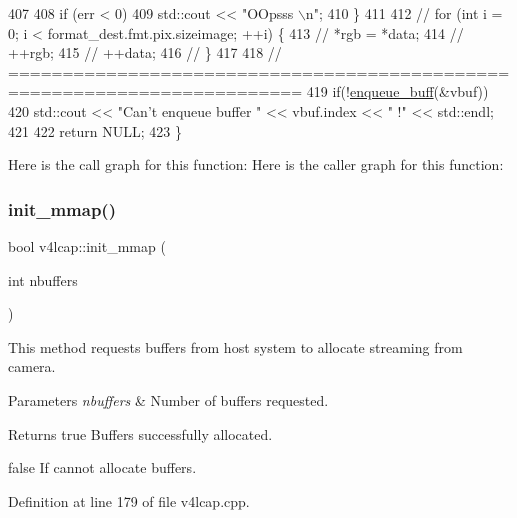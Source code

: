 \begin{DoxyCode}
407 
408         \textcolor{keywordflow}{if} (err < 0)
409             std::cout << \textcolor{stringliteral}{"OOpsss \(\backslash\)n"};
410     \}
411 
412 \textcolor{comment}{//      for (int i = 0; i < format\_dest.fmt.pix.sizeimage; ++i) \{}
413 \textcolor{comment}{//          *rgb = *data;}
414 \textcolor{comment}{//          ++rgb;}
415 \textcolor{comment}{//          ++data;}
416 \textcolor{comment}{//      \}}
417 
418     \textcolor{comment}{// =========================================================================}
419     \textcolor{keywordflow}{if}(!\hyperlink{classv4lcap_a61dcacb5bb57a9f8c72d6942f46e9ddc}{enqueue\_buff}(&vbuf))
420         std::cout << \textcolor{stringliteral}{"Can't enqueue buffer "} << vbuf.index << \textcolor{stringliteral}{" !"} << std::endl;
421 
422     \textcolor{keywordflow}{return} NULL;
423 \}
\end{DoxyCode}
Here is the call graph for this function\+:
Here is the caller graph for this function\+:
\mbox{\label{classv4lcap_a04f75c0a68f0e8547925906a488bb50d}} 
\subsubsection{\texorpdfstring{init\+\_\+mmap()}{init\_mmap()}\hspace{0.1cm}{\footnotesize\ttfamily [1/2]}}
{\footnotesize\ttfamily bool v4lcap\+::init\+\_\+mmap (\begin{DoxyParamCaption}\item[{int}]{nbuffers }\end{DoxyParamCaption})}



This method requests buffers from host system to allocate streaming from camera. 


\begin{DoxyParams}{Parameters}
{\em nbuffers} & Number of buffers requested. \\
\hline
\end{DoxyParams}
\begin{DoxyReturn}{Returns}
true Buffers successfully allocated. 

false If cannot allocate buffers. 
\end{DoxyReturn}


Definition at line 179 of file v4lcap.\+cpp.




